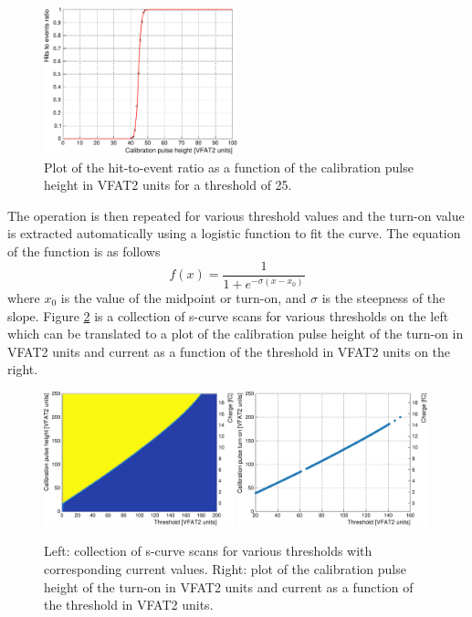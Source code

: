       \begin{figure}[t!]
        \centering
        \includegraphics[width=0.5\textwidth]{img/plots/cSCurve_T25-crop}
        \caption{Plot of the hit-to-event ratio as a function of the calibration pulse height in VFAT2 units for a threshold of 25.}
        \label{fig:II-4-scurve}
      \end{figure}

      The operation is then repeated for various threshold values and the turn-on value is extracted automatically using a logistic function to fit the curve. The equation of the function is as follows
      \begin{equation}
        \label{eq:II-4-logistic}
        f(x) = \frac{1}{1 + e^{-\sigma \left( x - x_0 \right)}}
      \end{equation}
      where $ x_0 $ is the value of the midpoint or turn-on, and $ \sigma $ is the steepness of the slope. Figure \ref{fig:II-4-scurves} is a collection of s-curve scans for various thresholds on the left which can be translated to a plot of the calibration pulse height of the turn-on in VFAT2 units and current as a function of the threshold in VFAT2 units on the right. \\

      \begin{figure}[b!]
        \centering
        \includegraphics[width=0.49\textwidth]{img/plots/cSCurve_ThresholdVCal-crop}
        \includegraphics[width=0.49\textwidth]{img/plots/cSCurve_TurnOn-crop}
        \caption{Left: collection of s-curve scans for various thresholds with corresponding current values. Right: plot of the calibration pulse height of the turn-on in VFAT2 units and current as a function of the threshold in VFAT2 units.}
        \label{fig:II-4-scurves}
      \end{figure}

